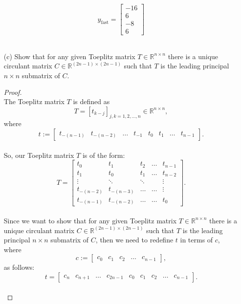 \documentclass[12pt]{article}
\def\R{\mathbb{R}}
\begin{document}
\begin{itemize}
 $$y_{\text{fast}} = \begin{bmatrix}
 			-16 \\
 			6 \\
 			-8 \\
 			6 
 			\end{bmatrix}$$\\
 
 
 \item[(c)] Show that for any given Toeplitz matrix $T \in \R^{n\times n}$ there is a unique circulant matrix $C \in \R^{(2n-1)\times(2n-1)}$ such that $T$ is the leading principal $n\times n$ submatrix of $C$.\\
 
 \begin{proof} $\text{ }$\\
 The Toeplitz matrix $T$ is defined as 
 $$T = [t_{k-j}]_{j,k=1,2,\dots ,n} \in \R^{n\times n},$$ 
 where 
 $$t:= \begin{bmatrix}
 		t_{-(n-1)} & t_{-(n-2)} & \hdots & t_{-1} & t_0 & t_1 & \hdots & t_{n-1}
 		\end{bmatrix}.$$\\
 		
So, our Toeplitz matrix $T$ is of the form:\\
$$T = \begin{bmatrix}
	t_0 & t_1 & t_2 & \hdots & t_{n-1} \\
	t_1 & t_0 & t_1 & \hdots & t_{n-2} \\
	\vdots & \ddots & \ddots &  & \vdots \\
	t_{-(n-2)} & t_{-(n-3)} & \hdots & \hdots & \vdots \\
	t_{-(n-1)} & t_{-(n-2)} & \hdots & \hdots & t_0
	\end{bmatrix}.$$\\

Since we want to show that for any given Toeplitz matrix $T \in \R^{n\times n}$ there is a unique circulant matrix $C \in \R^{(2n-1)\times (2n-1)}$ such that $T$ is the leading principal $n\times n$ submatrix of $C$, then we need to redefine $t$ in terms of $c$, where
$$c:= \begin{bmatrix}
		c_0 & c_1 & c_2 & \hdots & c_{n-1}
		\end{bmatrix},$$
as follows:\\
$$ t = \begin{bmatrix}
		c_n & c_{n+1} & \hdots & c_{2n-1} & c_0 & c_1 & c_2 & \hdots & c_{n-1}
		\end{bmatrix}.$$\\


\end{proof}
\end{itemize}
\end{document}
